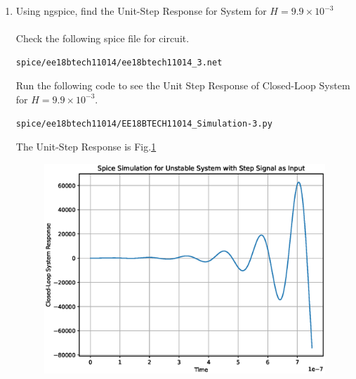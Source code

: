 \begin{enumerate}[label=\thesection.\arabic*.,ref=\thesection.\theenumi]
\item Using ngspice, find the Unit-Step Response for System for $H=9.9\times 10^{-3}$\\
\solution\\
Check the following spice file for circuit.
\begin{lstlisting}
spice/ee18btech11014/ee18btech11014_3.net
\end{lstlisting}

Run the following code to see the Unit Step Response of Closed-Loop System for $H=9.9\times 10^{-3}$.
\begin{lstlisting}
spice/ee18btech11014/EE18BTECH11014_Simulation-3.py
\end{lstlisting}

The Unit-Step Response is Fig.\ref{fig:Unstable System}
\begin{figure}[ht!]
	\begin{center}
		\includegraphics[width=\columnwidth]{./figs/ee18btech11014/ee18btech11014_Spice_Result.eps}
	\end{center}
	\caption{}
	\label{fig:Unstable System}
\end{figure}
\end{enumerate}
